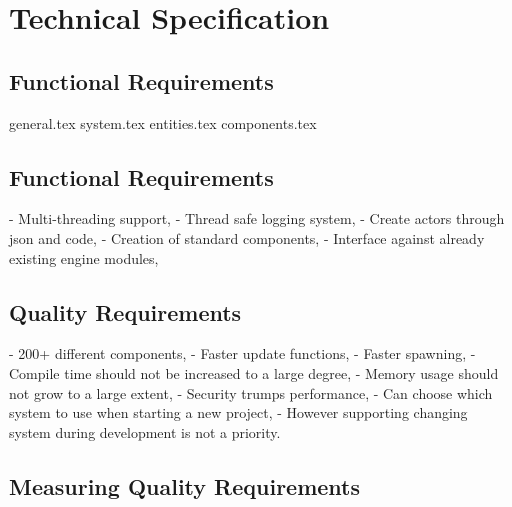 \documentclass{article}
\begin{document}

\section*{Technical Specification}
\subsection*{Functional Requirements}
{general.tex}
{system.tex}
{entities.tex}
{components.tex}

\subsection*{Functional Requirements}
- Multi-threading support,
- Thread safe logging system,
- Create actors through json and code,
- Creation of standard components,
- Interface against already existing engine modules,

\subsection*{Quality Requirements}
- 200+ different components,
- Faster update functions,
- Faster spawning,
- Compile time should not be increased to a large degree,
- Memory usage should not grow to a large extent,
- Security trumps performance, 
- Can choose which system to use when starting a new project,
    - However supporting changing system during development is not a priority.

\subsection*{Measuring Quality Requirements}
\end{document}
